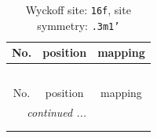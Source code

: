\documentclass[fleqn,8pt]{jsarticle}
\begin{document}
\renewcommand{\arraystretch}{1.2}
\begin{longtable}{ccc}
\caption{Wyckoff site: {\tt 16f}, site symmetry: {\tt .3m1'}}
 \\
 \hline \hline
No. & position & mapping \\ \hline \endfirsthead

\multicolumn{2}{l}{\tablename\ \thetable{}} \\
 \hline \hline
No. & position & mapping \\ \hline \endhead

 \hline \hline
\multicolumn{2}{r}{\footnotesize\it continued ...} \\ \endfoot

 \hline \hline
\multicolumn{2}{r}{} \\ \endlastfoot


\end{longtable}
\end{document}
